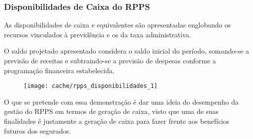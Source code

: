 
\subsubsection{Disponibilidades de Caixa do RPPS}

As disponibilidades de caixa e equivalentes são apresentadas englobando os recursos vinculados à previdência e os da taxa administrativa.

O saldo projetado apresentado considera o saldo inicial do período, somando-se a previsão de receitas e subtraindo-se a previsão de despesas conforme a programação financeira estabelecida.



\begin{figure}[H]
\center
\texttt{[image: cache/rpps\_disponibilidades\_1]}
\end{figure}

O que se pretende com essa demonstração é dar uma ideia do desempenho da gestão do RPPS em termos de geração de caixa, visto que uma de suas finalidades é justamente a geração de caixa para fazer frente aos benefícios futuros dos segurados.
